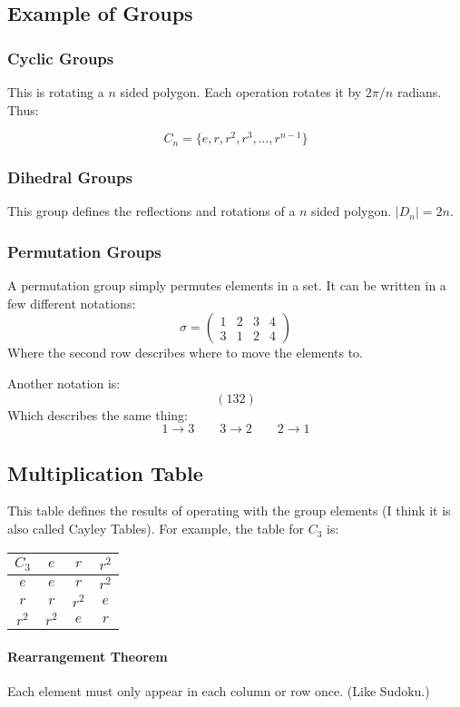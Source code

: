 \documentclass[12pt]{article}
\begin{document}
\subsection{Example of Groups}

\subsubsection{Cyclic Groups}
This is rotating a $n$ sided polygon. Each operation rotates it by $2\pi/n$ radians. Thus:

\[ C_n = \{e,r,r^2,r^3,...,r^{n-1}\}\]

\subsubsection{Dihedral Groups}
This group defines the reflections and rotations of a $n$ sided polygon. $|D_n| = 2n$.
\subsubsection{Permutation Groups}
A permutation group simply permutes elements in a set. It can be written in a few different notations:
\[ \sigma = 
\begin{pmatrix}
1 & 2 & 3 & 4\\
3 & 1 & 2 & 4
\end{pmatrix}\]
Where the second row describes where to move the elements to.

Another notation is:
\[ (132) \]
Which describes the same thing:
\[ 1 \to 3 \qquad 3 \to 2 \qquad 2\to 1\]
\subsection{Multiplication Table}
This table defines the results of operating with the group elements (I think it is also called Cayley Tables). For example, the table for $C_3$ is:

\begin{table}[h]
    \centering
    \begin{tabular}{c|ccc}
         $C_3$ & $e$ & $r$ & $r^2$  \\
         \hline
         $e$ & $e$ & $r$ & $r^2$\\
         $r$ & $r$ & $r^2$ & $e$\\
         $r^2$& $r^2$ & $e$ & $r$
    \end{tabular}
    \label{tab:c3}
\end{table}

\paragraph{Rearrangement Theorem}
Each element must only appear in each column or row once. (Like Sudoku.)
\end{document}
